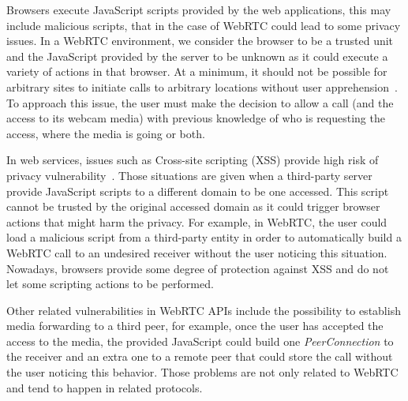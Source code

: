 Browsers execute JavaScript scripts provided by the web applications, this may include malicious scripts, that in the case of WebRTC could lead to some privacy issues. In a WebRTC environment, we consider the browser to be a trusted unit and the JavaScript provided by the server to be unknown as it could execute a variety of actions in that browser. At a minimum, it should not be possible for arbitrary sites to initiate calls to arbitrary locations without user apprehension~\cite{rtcwebSecurityIETF}. To approach this issue, the user must make the decision to allow a call (and the access to its webcam media) with previous knowledge of who is requesting the access, where the media is going or both.


In web services, issues such as Cross-site scripting (XSS)  provide high risk of privacy vulnerability~\cite{crosssitescripting}. Those situations are given when a third-party server provide JavaScript scripts to a different domain to be one accessed. This script cannot be trusted by the original accessed domain as it could trigger browser actions that might harm the privacy. For example, in WebRTC, the user could load a malicious script from a third-party entity in order to automatically build a WebRTC call to an undesired receiver without the user noticing this situation. Nowadays, browsers provide some degree of protection against XSS and do not let some scripting actions to be performed.

Other related vulnerabilities in WebRTC APIs include the possibility to establish media forwarding to a third peer, for example, once the user has accepted the access to the media, the provided JavaScript could build one {\it PeerConnection} to the receiver and an extra one to a remote peer that could store the call without the user noticing this behavior. Those problems are not only related to WebRTC and tend to happen in related protocols.

